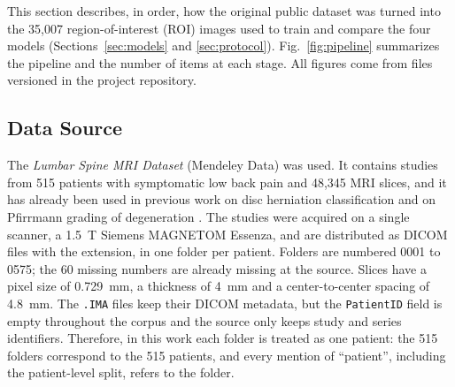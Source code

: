 \providecommand{\arch}[1]{\path{#1}}

This section describes, in order, how the original public dataset was turned into the 35,007 region-of-interest (ROI) images used to train and compare the four models (Sections~\ref{sec:models} and \ref{sec:protocol}). Fig.~\ref{fig:pipeline} summarizes the pipeline and the number of items at each stage. All figures come from files versioned in the project repository.

\subsection{Data Source}
\label{sec:origin}
The \emph{Lumbar Spine MRI Dataset} (Mendeley Data) \cite{sudirman2019} was used. It contains studies from 515 patients with symptomatic low back pain and 48,345 MRI slices, and it has already been used in previous work on disc herniation classification \cite{sari2025} and on Pfirrmann grading of degeneration \cite{natalia2024}. The studies were acquired on a single scanner, a 1.5~T Siemens MAGNETOM Essenza, and are distributed as DICOM files with the \arch{.IMA} extension, in one folder per patient. Folders are numbered 0001 to 0575; the 60 missing numbers are already missing at the source. Slices have a pixel size of 0.729~mm, a thickness of 4~mm and a center-to-center spacing of 4.8~mm. The \texttt{.IMA} files keep their DICOM metadata, but the \texttt{PatientID} field is empty throughout the corpus and the source only keeps study and series identifiers. Therefore, in this work each folder is treated as one patient: the 515 folders correspond to the 515 patients, and every mention of ``patient'', including the patient-level split, refers to the folder.

